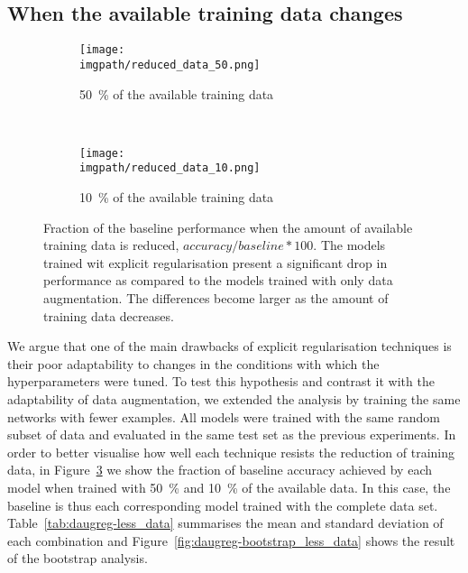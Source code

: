 {\subsection{When the available training data changes}
\label{sec:daugreg-less_data}
\begin{figure}[ht]
  \centering
  \begin{subfigure}{\linewidth}
      \texttt{[image: \\imgpath/reduced\_data\_50.png]}
      \caption{50~\% of the available training data}
	  \label{fig:daugreg-less_data_50}
  \end{subfigure}
  \\ 
  \begin{subfigure}{\linewidth}
      \texttt{[image: \\imgpath/reduced\_data\_10.png]}
      \caption{10~\% of the available training data}
	  \label{fig:daugreg-less_data_10}
  \end{subfigure}
  \caption{Fraction of the baseline performance when the amount of available training data is reduced, $accuracy/baseline * 100$. The models trained wit explicit regularisation present a significant drop in performance as compared to the models trained with only data augmentation. The differences become larger as the amount of training data decreases.}
  \label{fig:daugreg-less_data}
\end{figure}

We argue that one of the main drawbacks of explicit regularisation techniques is their poor adaptability to changes in the conditions with which the hyperparameters were tuned. To test this hypothesis and contrast it with the adaptability of data augmentation, we extended the analysis by training the same networks with fewer examples. All models were trained with the same random subset of data and evaluated in the same test set as the previous experiments. In order to better visualise how well each technique resists the reduction of training data, in Figure~\ref{fig:daugreg-less_data} we show the fraction of baseline accuracy achieved by each model when trained with 50~\% and 10~\% of the available data. In this case, the baseline is thus each corresponding model trained with the complete data set. Table~\ref{tab:daugreg-less_data} summarises the mean and standard deviation of each combination and Figure~\ref{fig:daugreg-bootstrap_less_data} shows the result of the bootstrap analysis.

}
